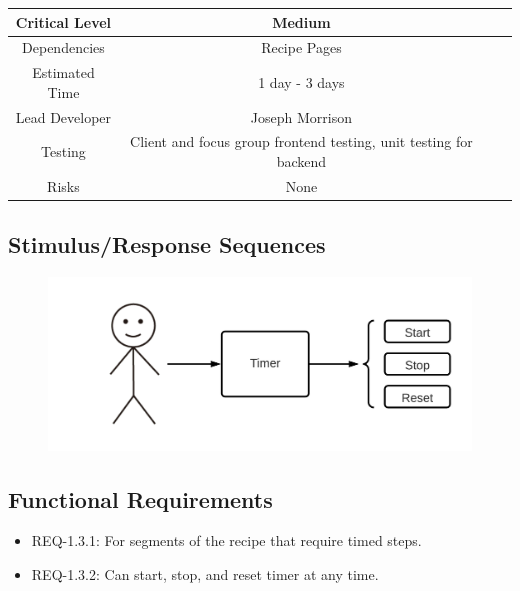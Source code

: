 \documentclass{scrreprt}
\begin{document}
\begin{center}
    \begin{tabular}{| c | c | c | c |}
        \hline
        Critical Level & Medium                                                            \\
        \hline
        Dependencies   & Recipe Pages                                                      \\
        \hline
        Estimated Time & 1 day - 3 days                                                    \\
        \hline
        Lead Developer & Joseph Morrison                                                   \\
        \hline
        Testing        & Client and focus group frontend testing, unit testing for backend \\
        \hline
        Risks          & None                                                              \\
        \hline
    \end{tabular}
\end{center}

\subsection{Stimulus/Response Sequences}

\begin{figure}[H]\centering
    \includegraphics[width=\columnwidth]{FlowCharts/Recipe-Timer.png}
\end{figure}

\subsection{Functional Requirements}

\begin{itemize}
    \item REQ-1.3.1: For segments of the recipe that require timed steps.
    \item REQ-1.3.2: Can start, stop, and reset timer at any time.
\end{itemize}
\end{document}

